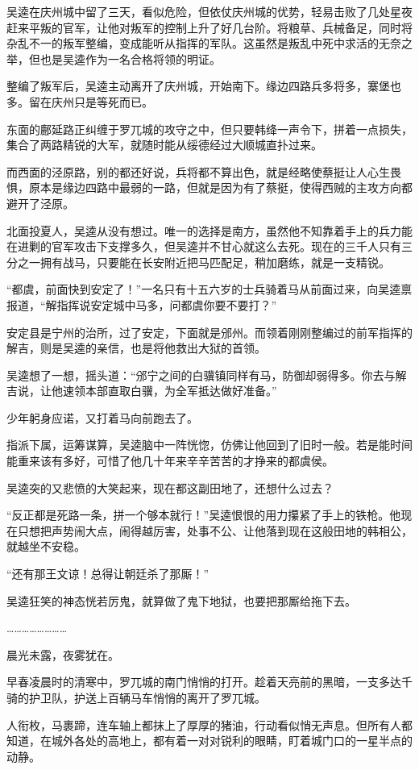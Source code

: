 吴逵在庆州城中留了三天，看似危险，但依仗庆州城的优势，轻易击败了几处星夜赶来平叛的官军，让他对叛军的控制上升了好几台阶。将粮草、兵械备足，同时将杂乱不一的叛军整编，变成能听从指挥的军队。这虽然是叛乱中死中求活的无奈之举，但也是吴逵作为一名合格将领的明证。

整编了叛军后，吴逵主动离开了庆州城，开始南下。缘边四路兵多将多，寨堡也多。留在庆州只是等死而已。

东面的鄜延路正纠缠于罗兀城的攻守之中，但只要韩绛一声令下，拼着一点损失，集合了两路精锐的大军，就随时能从绥德经过大顺城直扑过来。

而西面的泾原路，别的都还好说，兵将都不算出色，就是经略使蔡挺让人心生畏惧，原本是缘边四路中最弱的一路，但就是因为有了蔡挺，使得西贼的主攻方向都避开了泾原。

北面投夏人，吴逵从没有想过。唯一的选择是南方，虽然他不知靠着手上的兵力能在进剿的官军攻击下支撑多久，但吴逵并不甘心就这么去死。现在的三千人只有三分之一拥有战马，只要能在长安附近把马匹配足，稍加磨练，就是一支精锐。

“都虞，前面快到安定了！”一名只有十五六岁的士兵骑着马从前面过来，向吴逵禀报道，“解指挥说安定城中马多，问都虞你要不要打？”

安定县是宁州的治所，过了安定，下面就是邠州。而领着刚刚整编过的前军指挥的解吉，则是吴逵的亲信，也是将他救出大狱的首领。

吴逵想了一想，摇头道：“邠宁之间的白骥镇同样有马，防御却弱得多。你去与解吉说，让他速领本部直取白骥，为全军抵达做好准备。”

少年躬身应诺，又打着马向前跑去了。

指派下属，运筹谋算，吴逵脑中一阵恍惚，仿佛让他回到了旧时一般。若是能时间能重来该有多好，可惜了他几十年来辛辛苦苦的才挣来的都虞侯。

吴逵突的又悲愤的大笑起来，现在都这副田地了，还想什么过去？

“反正都是死路一条，拼一个够本就行！”吴逵恨恨的用力攥紧了手上的铁枪。他现在只想把声势闹大点，闹得越厉害，处事不公、让他落到现在这般田地的韩相公，就越坐不安稳。

“还有那王文谅！总得让朝廷杀了那厮！”

吴逵狂笑的神态恍若厉鬼，就算做了鬼下地狱，也要把那厮给拖下去。

……………………

晨光未露，夜雾犹在。

早春凌晨时的清寒中，罗兀城的南门悄悄的打开。趁着天亮前的黑暗，一支多达千骑的护卫队，护送上百辆马车悄悄的离开了罗兀城。

人衔枚，马裹蹄，连车轴上都抹上了厚厚的猪油，行动看似悄无声息。但所有人都知道，在城外各处的高地上，都有着一对对锐利的眼睛，盯着城门口的一星半点的动静。

